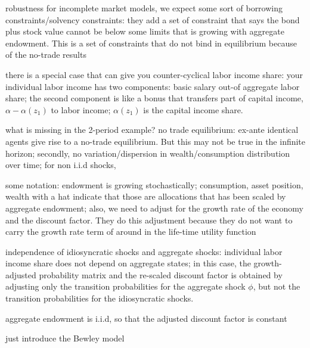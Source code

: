 \begin{frame}{robustness}
for incomplete market models, we expect some sort of borrowing constraints/solvency constraints: they add a set of constraint that says the bond plus stock value cannot be below some limits that is growing with aggregate endowment. This is a set of constraints that do not bind in equilibrium because of the no-trade results

there is a special case that can give you counter-cyclical labor income share: your individual labor income has two components: basic salary out-of aggregate labor share; the second component is like a bonus that transfers part of capital income, $\alpha-\alpha(z_1)$ to labor income; $\alpha(z_1)$ is the capital income share. 

\end{frame}
\begin{frame}{what is missing in the 2-period example?}
no trade equilibrium: ex-ante identical agents give rise to a no-trade equilibrium. But this may not be true in the infinite horizon; secondly, no variation/dispersion in wealth/consumption distribution over time; for non i.i.d shocks, 

\end{frame}
\begin{frame}
some notation: endowment is growing stochastically; consumption, asset position, wealth with a hat indicate that those are allocations that has been scaled by aggregate endowment; also, we need to adjust for the growth rate of the economy and the discount factor. They do this adjustment because they do not want to carry the growth rate term of around in the life-time utility function
\end{frame}
\begin{frame}
independence of idiosyncratic shocks and aggregate shocks: individual labor income share does not depend on aggregate states; in this case, the growth-adjusted probability matrix and the re-scaled discount factor is obtained by adjusting only the transition probabilities for the aggregate shock $\phi$, but not the transition probabilities for the idiosyncratic shocks.

aggregate endowment is i.i.d, so that the adjusted discount factor is constant
\end{frame}
\begin{frame}
just introduce the Bewley model
\end{frame}
